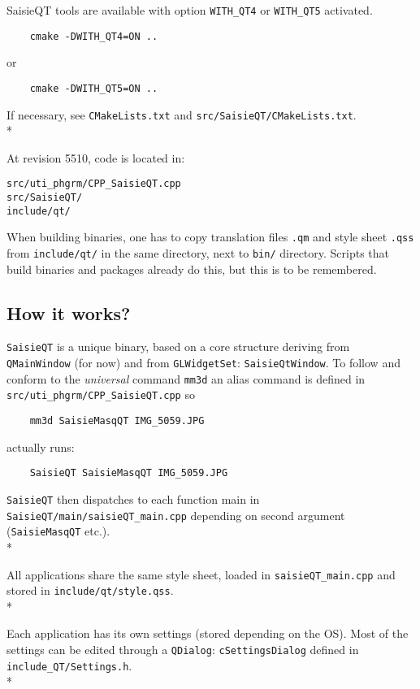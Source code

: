 \documentclass[a4paper]{book}
\begin{document}
SaisieQT tools are available with option {\tt WITH\_QT4} or {\tt WITH\_QT5} activated.

\begin{verbatim}
    cmake -DWITH_QT4=ON ..
\end{verbatim}
 or
\begin{verbatim}
    cmake -DWITH_QT5=ON ..
\end{verbatim}

If necessary, see {\tt CMakeLists.txt} and {\tt src/SaisieQT/CMakeLists.txt}.\\*

At revision 5510, code is located in:
\begin{verbatim}
src/uti_phgrm/CPP_SaisieQT.cpp
src/SaisieQT/
include/qt/
\end{verbatim}

When building binaries, one has to copy translation files {\tt .qm} and style sheet {\tt .qss} from {\tt include/qt/} in the same directory, next to {\tt bin/} directory. Scripts that build binaries and packages already do this, but this is to be remembered.

\subsection{How it works?}

{\tt SaisieQT} is a unique binary, based on a core structure deriving from {\tt QMainWindow} (for now) and from {\tt GLWidgetSet}: {\tt SaisieQtWindow}. To follow and conform to the \textit{universal} command {\tt mm3d} an alias command is defined in {\tt src/uti\_phgrm/CPP\_SaisieQT.cpp} so 

\begin{verbatim}
	mm3d SaisieMasqQT IMG_5059.JPG
\end{verbatim}

actually runs:

\begin{verbatim}
	SaisieQT SaisieMasqQT IMG_5059.JPG
\end{verbatim}

{\tt SaisieQT} then dispatches to each function main in {\tt SaisieQT/main/saisieQT\_main.cpp}  depending on second argument ({\tt SaisieMasqQT} etc.).\\*

All applications share the same style sheet, loaded in {\tt saisieQT\_main.cpp} and stored in {\tt include/qt/style.qss}.\\*

Each application has its own settings (stored depending on the OS). Most of the settings can be edited through a {\tt QDialog}: {\tt cSettingsDialog} defined in {\tt include\_QT/Settings.h}.\\*
\end{document}
